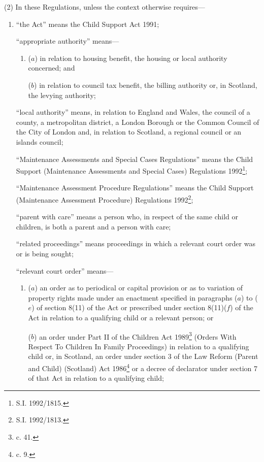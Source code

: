 \documentclass[a4paper]{article}
\begin{document}
(2) In these Regulations, unless the context otherwise requires—
\begin{enumerate}\item[]
“the Act” means the Child Support Act 1991;

“appropriate authority” means—
\begin{enumerate}\item[]
($a$) in relation to housing benefit, the housing or local authority concerned; and

($b$) in relation to council tax benefit, the billing authority or, in Scotland, the levying authority;
\end{enumerate}

“local authority” means, in relation to England and Wales, the council of a county, a metropolitan district, a London Borough or the Common Council of the City of London and, in relation to Scotland, a regional council or an islands council;

“Maintenance Assessments and Special Cases Regulations” means the Child Support (Maintenance Assessments and Special Cases) Regulations 1992\footnote{\frenchspacing S.I. 1992/1815.};

“Maintenance Assessment Procedure Regulations” means the Child Support (Maintenance Assessment Procedure) Regulations 1992\footnote{\frenchspacing S.I. 1992/1813.};

“parent with care” means a person who, in respect of the same child or children, is both a parent and a person with care;

“related proceedings” means proceedings in which a relevant court order was or is being sought;

“relevant court order” means—
\begin{enumerate}\item[]
($a$) an order as to periodical or capital provision or as to variation of property rights made under an enactment specified in paragraphs ($a$) to ($e$) of section 8(11) of the Act or prescribed under section 8(11)($f$) of the Act in relation to a qualifying child or a relevant person; or

($b$) an order under Part II of the Children Act 1989\footnote{ c. 41.} (Orders With Respect To Children In Family Proceedings) in relation to a qualifying child or, in Scotland, an order under section 3 of the Law Reform (Parent and Child) (Scotland) Act 1986\footnote{ c. 9.} or a decree of declarator under section 7 of that Act in relation to a qualifying child;
\end{enumerate}


\end{enumerate}
\end{document}
